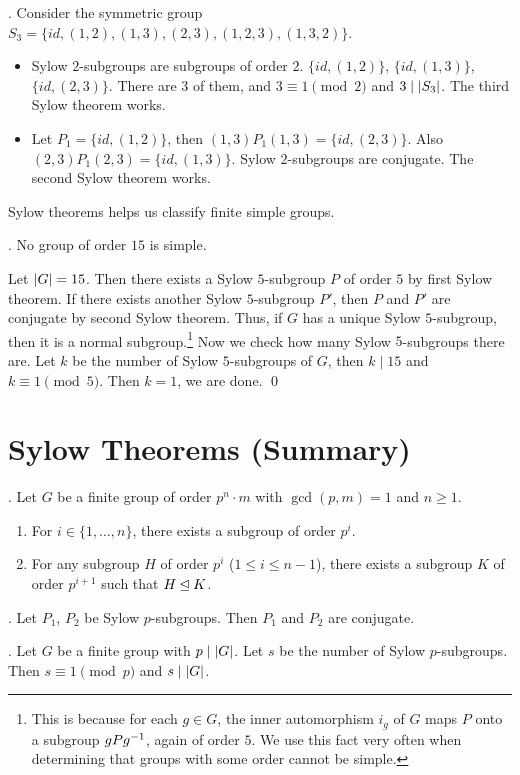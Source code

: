 \ex. Consider the symmetric group \(S_3 = \{id, (1, 2), (1, 3), (2, 3), (1, 2, 3), (1, 3, 2)\}\).
\begin{itemize}
    \item Sylow \(2\)-subgroups are subgroups of order \(2\). \(\{id, (1, 2)\}\), \(\{id, (1, 3)\}\), \(\{id, (2, 3)\}\). There are \(3\) of them, and \(3 \equiv 1 \pmod 2\) and \(3 \mid \left| S_3 \right|\). The third Sylow theorem works.
    \item Let \(P_1 = \{id, (1, 2)\}\), then \((1, 3) P_1 (1, 3) = \{id, (2, 3)\}\). Also \((2, 3)P_1(2, 3) = \{id, (1, 3)\}\). Sylow \(2\)-subgroups are conjugate. The second Sylow theorem works.
\end{itemize}

Sylow theorems helps us classify finite simple groups.

\ex. No group of order \(15\) is simple.

\pf Let \(\left| G \right| = 15\). Then there exists a Sylow \(5\)-subgroup \(P\) of order \(5\) by first Sylow theorem. If there exists another Sylow \(5\)-subgroup \(P'\), then \(P\) and \(P'\) are conjugate by second Sylow theorem. Thus, if \(G\) has a unique Sylow \(5\)-subgroup, then it is a normal subgroup.\footnote{This is because for each \(g \in G\), the inner automorphism \(i_g\) of \(G\) maps \(P\) onto a subgroup \(gPg^{-1}\), again of order \(5\). We use this fact very often when determining that groups with some order cannot be simple.} Now we check how many Sylow \(5\)-subgroups there are. Let \(k\) be the number of Sylow \(5\)-subgroups of \(G\), then \(k \mid 15\) and \(k \equiv 1 \pmod 5\). Then \(k = 1\), we are done. \qed

\section*{Sylow Theorems (Summary)}

\thm.  Let \(G\) be a finite group of order \(p^n \cdot m\) with \(\gcd(p, m) = 1\) and \(n \geq 1\).
\begin{enumerate}
    \item For \(i \in \{1, \dots, n\}\), there exists a subgroup of order \(p^i\).
    \item For any subgroup \(H\) of order \(p^i\) (\(1 \leq i \leq n - 1\)), there exists a subgroup \(K\) of order \(p^{i+1}\) such that \(H \unlhd K\).
\end{enumerate}

\thm.  Let \(P_1\), \(P_2\) be Sylow \(p\)-subgroups. Then \(P_1\) and \(P_2\) are conjugate.

\thm.  Let \(G\) be a finite group with \(p \mid \left| G \right|\). Let \(s\) be the number of Sylow \(p\)-subgroups. Then \(s \equiv 1 \pmod p\) and \(s \mid \left| G \right|\).

\pagebreak
